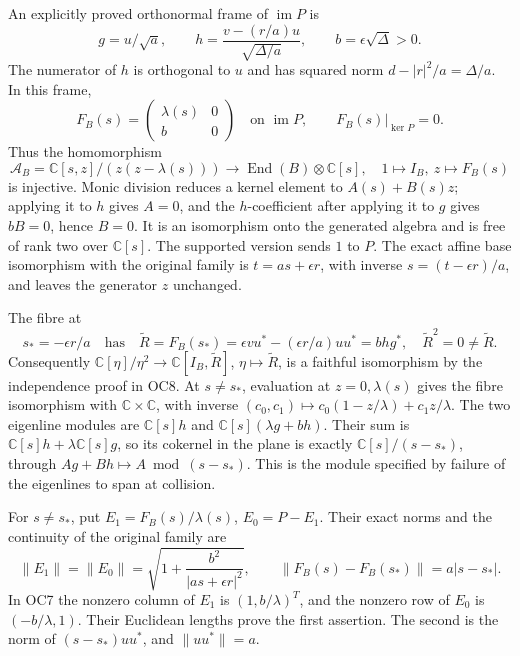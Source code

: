 \documentclass[
]{article}
\begin{document}
An explicitly proved orthonormal frame of \(\operatorname{im}P\) is \[
g=u/\sqrt a,\qquad h=\frac{v-(r/a)u}{\sqrt{\Delta/a}},\qquad b=\epsilon\sqrt\Delta>0.
\] The numerator of \(h\) is orthogonal to \(u\) and has squared norm
\(d-|r|^2/a=\Delta/a\). In this frame, \[
F_B(s)=\begin{pmatrix}\lambda(s)&0\\b&0\end{pmatrix}
\quad\text{on }\operatorname{im}P,
\qquad F_B(s)|_{\ker P}=0.
\tag{OC7}
\] Thus the homomorphism \[
\mathcal A_B=\mathbb C[s,z]/(z(z-\lambda(s)))
\longrightarrow\operatorname{End}(B)\otimes\mathbb C[s],
\quad 1\mapsto I_B,\ z\mapsto F_B(s)
\tag{OC8}
\] is injective. Monic division reduces a kernel element to
\(A(s)+B(s)z\); applying it to \(h\) gives \(A=0\), and the
\(h\)-coefficient after applying it to \(g\) gives \(bB=0\), hence
\(B=0\). It is an isomorphism onto the generated algebra and is free of
rank two over \(\mathbb C[s]\). The supported version sends \(1\) to
\(P\). The exact affine base isomorphism with the original family is
\(t=as+\epsilon r\), with inverse \(s=(t-\epsilon r)/a\), and leaves the
generator \(z\) unchanged.

The fibre at \[
s_*=-\epsilon r/a
\quad\text{has}\quad
\widetilde R=F_B(s_*)=\epsilon v u^*-(\epsilon r/a)uu^*=b h g^*,
\quad \widetilde R^2=0\ne\widetilde R.
\tag{OC9}
\] Consequently
\(\mathbb C[\eta]/\eta^2\to\mathbb C[I_B,\widetilde R]\),
\(\eta\mapsto\widetilde R\), is a faithful isomorphism by the
independence proof in OC8. At \(s\ne s_*\), evaluation at
\(z=0,\lambda(s)\) gives the fibre isomorphism with
\(\mathbb C\times\mathbb C\), with inverse
\((c_0,c_1)\mapsto c_0(1-z/\lambda)+c_1z/\lambda\). The two eigenline
modules are \(\mathbb C[s]h\) and \(\mathbb C[s](\lambda g+bh)\). Their
sum is \(\mathbb C[s]h+\lambda\mathbb C[s]g\), so its cokernel in the
plane is exactly \(\mathbb C[s]/(s-s_*)\), through
\(Ag+Bh\mapsto A\bmod(s-s_*)\). This is the module specified by failure
of the eigenlines to span at collision.

For \(s\ne s_*\), put \(E_1=F_B(s)/\lambda(s)\), \(E_0=P-E_1\). Their
exact norms and the continuity of the original family are \[
\|E_1\|=\|E_0\|=\sqrt{1+\frac{b^2}{|as+\epsilon r|^2}},
\qquad \|F_B(s)-F_B(s_*)\|=a|s-s_*|.
\tag{OC10}
\] In OC7 the nonzero column of \(E_1\) is \((1,b/\lambda)^T\), and the
nonzero row of \(E_0\) is \((-b/\lambda,1)\). Their Euclidean lengths
prove the first assertion. The second is the norm of \((s-s_*)uu^*\),
and \(\|uu^*\|=a\).
\end{document}
